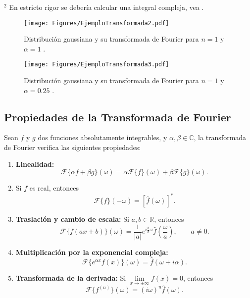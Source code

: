 \begin{ejemplo}
    {\footnotesize
    $^2$ En estricto rigor se debería calcular una integral compleja, vea \cite{Arfken}.
    }

\begin{figure}[H]
    \centering
    \texttt{[image: Figures/EjemploTransformada2.pdf]}
    \caption{Distribución gaussiana y su transformada de Fourier para $n=1$ y $\alpha =1$ .}
    \label{Espectro3}
\end{figure}

\begin{figure}[H]
    \centering
    \texttt{[image: Figures/EjemploTransformada3.pdf]}
    \caption{Distribución gaussiana y su transformada de Fourier para $n=1$ y $\alpha =0.25$ .}
    \label{Espectro4}
\end{figure}
\end{ejemplo}

\subsection{Propiedades de la Transformada de Fourier}

Sean $f$ y $g$ dos funciones absolutamente integrables, y $\alpha,\beta \in \mathbb{C}$, la transformada de Fourier verifica las siguientes propiedades:
\begin{enumerate}
    \item \textbf{Linealidad:} 
    \begin{equation}
        \mathcal{F}\{\alpha f + \beta g\}(\omega) = \alpha \mathcal{F}\{f\}(\omega) + \beta \mathcal{F}\{g\}(\omega). 
    \end{equation}

\item Si $f$ es real, entonces
\begin{equation}
    \mathcal{F}\{f\}(-\omega) = [\hat{f}(\omega)]^{*}.
\end{equation}

\item \textbf{Traslación y cambio de escala:} Si $a,b\in \mathbb{R}$, entonces
\begin{equation}
    \mathcal{F}\{f(ax + b)\}(\omega) = \frac{1}{|a|} e^{i\frac{b}{a}\omega} \hat{f}\left( \frac{\omega}{a}\right), \qquad a \neq 0. \label{eq:Traslation-Fourier}
\end{equation}

\item \textbf{Multiplicación por la exponencial compleja:} 
\begin{equation}
    \mathcal{F}\{e^{\alpha x} f(x)\}(\omega) = \hat{f}(\omega + i \alpha).
\end{equation}

\item \textbf{Transformada de la derivada:} Si $\lim\limits_{x\to \pm\infty} f(x) = 0$, entonces
\begin{equation}
    \mathcal{F}\{f^{(n)}\}(\omega) = (i \omega)^{n} \hat{f}(\omega). \label{eq:Dev-Fourier}
\end{equation}
\end{enumerate}

